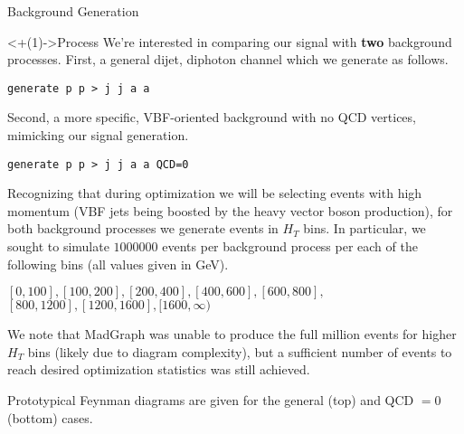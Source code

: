 \documentclass[]{beamer}
\begin{document}
\begin{frame}{Background Generation}
    \begin{block}<+(1)->{Process}
        We're interested in comparing our signal with \textbf{two} background processes. First, a general dijet, diphoton channel which we generate as follows.
        
        \smallskip
        
        \texttt{generate p p > j j a a}
        
        \smallskip
        
        Second, a more specific, VBF-oriented background with no QCD vertices, mimicking our signal generation.
        
        \smallskip
        
        \texttt{generate p p > j j a a QCD=0}
        
        \smallskip
        
        Recognizing that during optimization we will be selecting events with high momentum (VBF jets being boosted by the heavy vector boson production), for both background processes we generate events in $H_T$ bins. In particular, we sought to simulate $1000000$ events per background process per each of the following bins (all values given in GeV).
        
        \smallskip
        
        $[0,100], [100,200], [200,400], [400,600], [600,800],$ \newline 
        $[800,1200], [1200,1600], [1600,\infty)$
        
        \smallskip
        
        We note that MadGraph was unable to produce the full million events for higher $H_T$ bins (likely due to diagram complexity), but a sufficient number of events to reach desired optimization statistics was still achieved. 
        
        \smallskip
        
        Prototypical Feynman diagrams are given for the general (top) and QCD $= 0$ (bottom) cases.
    \end{block}
    

\end{frame}
\end{document}
